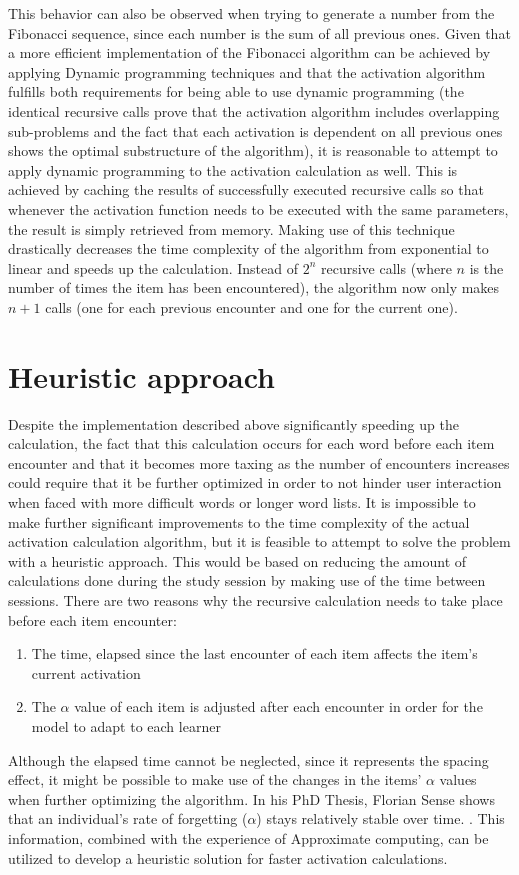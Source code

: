 \documentclass[a4paper]{report}
\begin{document}
This behavior can also be observed when trying to generate a number from the Fibonacci sequence, since each number is the sum of all previous ones. Given that a more efficient implementation of the Fibonacci algorithm can be achieved by applying Dynamic programming techniques and that the activation algorithm fulfills both requirements for being able to use dynamic programming (the identical recursive calls prove that the activation algorithm includes overlapping sub-problems and the fact that each activation is dependent on all previous ones shows the optimal substructure of the algorithm), it is reasonable to attempt to apply dynamic programming to the activation calculation as well. This is achieved by caching the results of successfully executed recursive calls so that whenever the activation function needs to be executed with the same parameters, the result is simply retrieved from memory. Making use of this technique drastically decreases the time complexity of the algorithm from exponential to linear and speeds up the calculation. Instead of $2^n$ recursive calls (where $n$ is the number of times the item has been encountered), the algorithm now only makes $n+1$ calls (one for each previous encounter and one for the current one).

\section{Heuristic approach}
Despite the implementation described above significantly speeding up the calculation, the fact that this calculation occurs for each word before each item encounter and that it becomes more taxing as the number of encounters increases could require that it be further optimized in order to not hinder user interaction when faced with more difficult words or longer word lists. It is impossible to make further significant improvements to the time complexity of the actual activation calculation algorithm, but it is feasible to attempt to solve the problem with a heuristic approach. This would be based on reducing the amount of calculations done during the study session by making use of the time between sessions. There are two reasons why the recursive calculation needs to take place before each item encounter:
\begin{enumerate}
    \item The time, elapsed since the last encounter of each item affects the item's current activation
    \item The $\alpha$ value of each item is adjusted after each encounter in order for the model to adapt to each learner
\end{enumerate}
Although the elapsed time cannot be neglected, since it represents the spacing effect, it might be possible to make use of the changes in the items' $\alpha$ values when further optimizing the algorithm. In his PhD Thesis, Florian Sense shows that an individual's rate of forgetting ($\alpha$) stays relatively stable over time. \cite{sense17}. This information, combined with the experience of Approximate computing, can be utilized to develop a heuristic solution for faster activation calculations.
\end{document}

